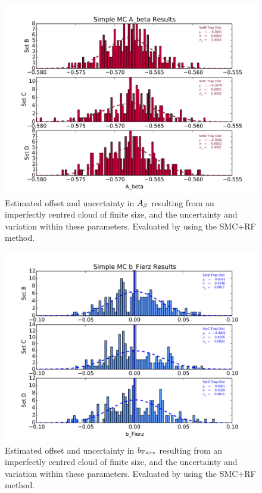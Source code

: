 \begin{figure}[h!!tb]
	\centering
	\includegraphics[width=.999\linewidth]
	{Figures/Position_Err_Abeta.png}
	\caption[$\Abeta$ Position Error]{Estimated offset and uncertainty in $\Abeta$ resulting from an imperfectly centred cloud of finite size, and the uncertainty and variation within these parameters.  Evaluated by using the SMC+RF method.}	
	\label{fig:Abeta_position_err}
\end{figure}

\begin{figure}[h!!tb]
	\centering
	\includegraphics[width=.999\linewidth]
	{Figures/Position_Err_bFierz.png}
	\caption[$\bFierz$ Position Error]{Estimated offset and uncertainty in $\bFierz$ resulting from an imperfectly centred cloud of finite size, and the uncertainty and variation within these parameters.  Evaluated by using the SMC+RF method.}		
	\label{fig:bFierz_position_err}
\end{figure}



